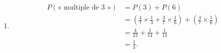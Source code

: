 {\begin{enumerate}
		\item
			\begin{align*}
				P(\text{« multiple de $3$ »}) &= P(3) + P(6) \\
					&= \left( \frac47 \times \frac13 + \frac37\times\frac16 \right) + \left( \frac37 \times \frac16 \right) \\
					&= \frac4{21} + \frac1{14} + \frac1{14} \\
					&= \frac13.
			\end{align*}
	\end{enumerate}
}

